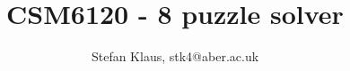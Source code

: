 \documentclass[journal]{IEEEtran}
\begin{document}
%
\title{CSM6120 - 8 puzzle solver }
%
%
%

\author{Stefan Klaus, stk4@aber.ac.uk}

% 
%













\maketitle
\end{document}
